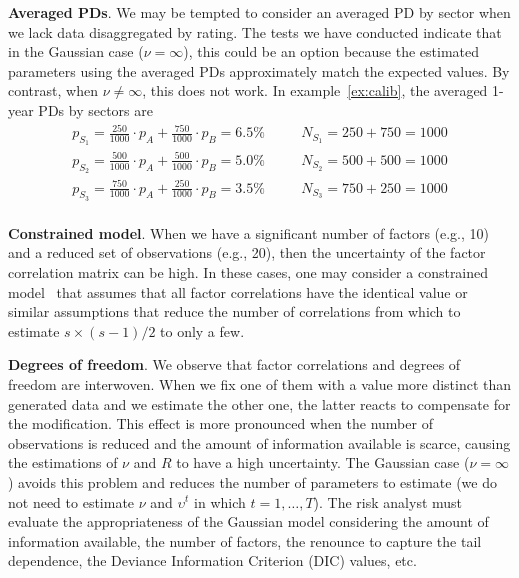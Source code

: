 \documentclass[11pt,fleqn]{book} %
\begin{document}
\textbf{Averaged PDs}. We may be tempted to consider an averaged PD by sector 
when we lack data disaggregated by rating. The tests we have conducted 
indicate that in the Gaussian case ($\nu = \infty$), this could be an option 
because the estimated parameters using the averaged PDs approximately match 
the expected values. By contrast, when $\nu \ne \infty$, this does not work. 
In example~\ref{ex:calib}, the averaged 1-year PDs by sectors are
\begin{displaymath}
	\begin{array}{lll}
		p_{S_1} = \frac{250}{1000} \cdot p_A + \frac{750}{1000} \cdot p_B = 6.5\% & \quad & N_{S_1} = 250 + 750 = 1000 \\
		p_{S_2} = \frac{500}{1000} \cdot p_A + \frac{500}{1000} \cdot p_B = 5.0\% & \quad & N_{S_2} = 500 + 500 = 1000 \\
		p_{S_3} = \frac{750}{1000} \cdot p_A + \frac{250}{1000} \cdot p_B = 3.5\% & \quad & N_{S_3} = 750 + 250 = 1000 \\
	\end{array}
\end{displaymath}

\textbf{Constrained model}. When we have a significant number of factors 
(e.g., 10) and a reduced set of observations (e.g., 20), then the uncertainty 
of the factor correlation matrix can be high. In these cases, one may consider 
a constrained model~\cite{roncalli:2004} that assumes that all factor 
correlations have the identical value or similar assumptions that reduce the 
number of correlations from which to estimate $s{\times}(s-1)/2$ to only a 
few.

\textbf{Degrees of freedom}. We observe that factor correlations and degrees 
of freedom are interwoven. When we fix one of them with a value more distinct 
than generated data and we estimate the other one, the latter reacts to 
compensate for the modification. This effect is more pronounced when the 
number of observations is reduced and the amount of 
information available is scarce, causing the estimations of $\nu$ and $R$
to have a high uncertainty. The Gaussian case ($\nu = \infty$) avoids this 
problem and reduces the number of parameters to estimate (we do not need to 
estimate $\nu$ and $\upsilon^t$ in which $t=1,\dots,T$). 
The risk analyst must evaluate the appropriateness of the Gaussian model 
considering the amount of information available, the number of factors, 
the renounce to capture the tail dependence, the Deviance Information 
Criterion (DIC) values, etc.
\end{document}
